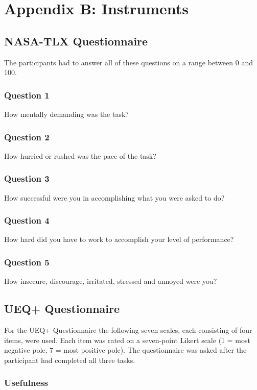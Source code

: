 \chapter{Appendix B: Instruments}
\section*{NASA-TLX Questionnaire}
The participants had to answer all of these questions on a range between 0 and 100.
\subsection*{Question 1}
How mentally demanding was the task?
\subsection*{Question 2}
How hurried or rushed was the pace of the task?
\subsection*{Question 3}
How successful were you in accomplishing what you were asked to do?
\subsection*{Question 4}
How hard did you have to work to accomplish your level of performance?
\subsection*{Question 5}
How insecure, discourage, irritated, stressed and annoyed were you?

\section*{UEQ+ Questionnaire}
For the UEQ+ Questionnaire the following seven scales, each consisting of four items, were used. Each item was rated on a seven-point Likert scale (1 = most negative pole, 7 = most positive pole). The questionnaire was asked after the participant had completed all three tasks.
\subsection*{Usefulness}
\begin{table}[H]
    \centering
\end{table}


